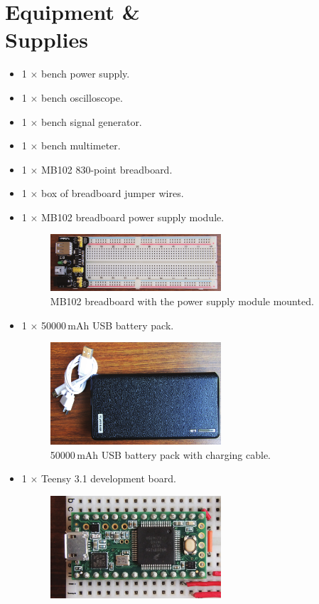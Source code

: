 \documentclass[letterpaper, 11pt]{article}
\begin{document}
\newpage
\section{Equipment \& \\Supplies}

\begin{itemize}[itemsep=0.5ex]
\item 1 $\times$ bench power supply.
\item 1 $\times$ bench oscilloscope.
\item 1 $\times$ bench signal generator.
\item 1 $\times$ bench multimeter.
\item 1 $\times$ MB102 830-point breadboard.	
\item 1 $\times$ box of breadboard jumper wires.
\item 1 $\times$ MB102 breadboard power supply module.	
	\begin{figure}[h]
		\centering
		\includegraphics[width=2.5in]{breadboard-pic}
		\caption{MB102 breadboard with the power supply module mounted.}
		\label{fig:breadboard-pic}
	\end{figure}
\item 1 $\times$ \num{50000}\,mAh USB battery pack.
	\begin{figure}[h]
		\centering
		\includegraphics[width=2.5in]{battery-pic}
		\caption{\num{50000}\,mAh USB battery pack with charging cable.}
		\label{fig:battery-pic}
	\end{figure}
\item 1 $\times$ Teensy 3.1 development board.	
	\begin{figure}[h]
		\centering
		\includegraphics[width=2.5in]{teensy-pic}

\end{figure}
\end{itemize}
\end{document}
